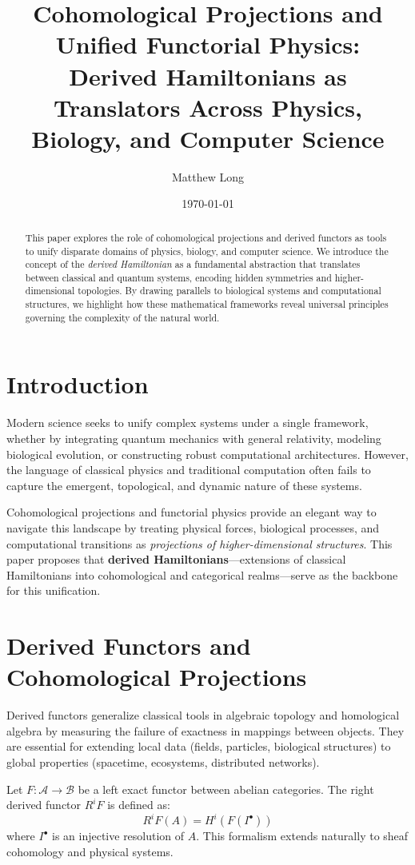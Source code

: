 \documentclass{article}
\title{\textbf{Cohomological Projections and Unified Functorial Physics:}\\
\large{Derived Hamiltonians as Translators Across Physics, Biology, and Computer Science}}
\author{Matthew Long}
\date{\today}
\begin{document}
\maketitle

\begin{abstract}
This paper explores the role of cohomological projections and derived functors as tools to unify disparate domains of physics, biology, and computer science. We introduce the concept of the \textit{derived Hamiltonian} as a fundamental abstraction that translates between classical and quantum systems, encoding hidden symmetries and higher-dimensional topologies. By drawing parallels to biological systems and computational structures, we highlight how these mathematical frameworks reveal universal principles governing the complexity of the natural world.
\end{abstract}

\section{Introduction}
Modern science seeks to unify complex systems under a single framework, whether by integrating quantum mechanics with general relativity, modeling biological evolution, or constructing robust computational architectures. However, the language of classical physics and traditional computation often fails to capture the emergent, topological, and dynamic nature of these systems.

Cohomological projections and functorial physics provide an elegant way to navigate this landscape by treating physical forces, biological processes, and computational transitions as \textit{projections of higher-dimensional structures}. This paper proposes that \textbf{derived Hamiltonians}—extensions of classical Hamiltonians into cohomological and categorical realms—serve as the backbone for this unification.

\section{Derived Functors and Cohomological Projections}
Derived functors generalize classical tools in algebraic topology and homological algebra by measuring the failure of exactness in mappings between objects. They are essential for extending local data (fields, particles, biological structures) to global properties (spacetime, ecosystems, distributed networks).

Let \( F : \mathcal{A} \to \mathcal{B} \) be a left exact functor between abelian categories. The right derived functor \( R^i F \) is defined as:
\[
R^i F(A) = H^i(F(I^\bullet))
\]
where \( I^\bullet \) is an injective resolution of \( A \). This formalism extends naturally to sheaf cohomology and physical systems.
\end{document}
